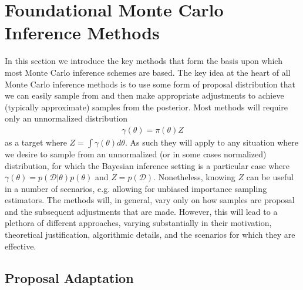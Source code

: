 
\section{Foundational Monte Carlo Inference Methods}
\label{sec:inf:foundation}

In this section we introduce the key methods that form
the basis upon which most Monte Carlo inference schemes are based.  The
key idea at the heart of all Monte Carlo inference methods is to use some form
of proposal distribution that we can easily sample from and then make
appropriate adjustments to achieve (typically approximate) samples from
the posterior.  Most methods will require only an unnormalized distribution
\begin{align}
\label{eq:inf:unnorm-target}
\gamma(\theta) = \pi(\theta)Z
\end{align}
as a target where $Z = \int \gamma(\theta) d\theta$.  As such they will apply to
any situation where we desire to sample from an unnormalized 
(or in some cases normalized) distribution, for which
the Bayesian inference setting is a particular case where
$\gamma(\theta) = p(\mathcal{D}|\theta)p(\theta)$ and $Z = p(\mathcal{D})$.
Nonetheless, knowing $Z$ can be useful in a number of scenarios, e.g. allowing
for unbiased importance sampling estimators.
The methods will, in general, vary only on how samples are proposal
and the subsequent adjustments that are made.  However, this will lead to a
plethora of different approaches, varying substantially in their motivation,
theoretical justification, algorithmic details, and the scenarios for which they
are effective.






\subsection{Proposal Adaptation}
\label{sec:inf:proposal-adapt}